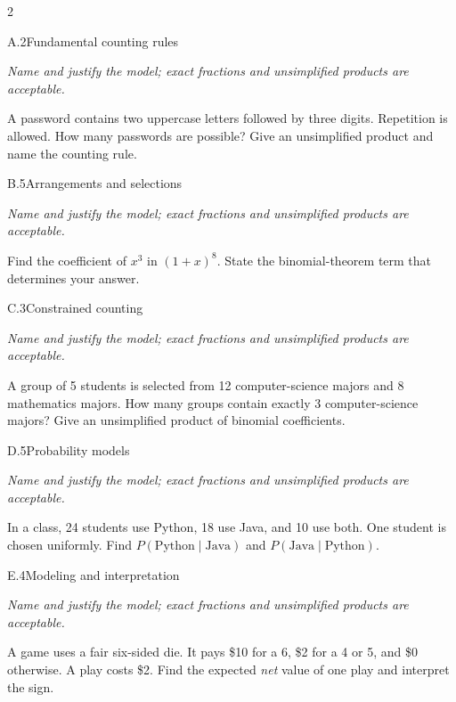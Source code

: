 \documentclass[9pt]{extarticle}
\begin{document}
\CoreWorkArea
\FormBreak
{}
\begin{multicols}{2}
\begin{CoreProblem}{A.2}{Fundamental counting rules}
{\scriptsize\textit{Name and justify the model; exact fractions and unsimplified products are acceptable.}\par}
A password contains two uppercase letters followed by three digits.
    Repetition is allowed. How many passwords are possible? Give an unsimplified
    product and name the counting rule.
\end{CoreProblem}
\begin{CoreProblem}{B.5}{Arrangements and selections}
{\scriptsize\textit{Name and justify the model; exact fractions and unsimplified products are acceptable.}\par}
Find the coefficient of $x^3$ in $(1+x)^8$. State the binomial-theorem
    term that determines your answer.
\end{CoreProblem}
\begin{CoreProblem}{C.3}{Constrained counting}
{\scriptsize\textit{Name and justify the model; exact fractions and unsimplified products are acceptable.}\par}
A group of 5 students is selected from 12 computer-science majors and
    8 mathematics majors. How many groups contain exactly 3 computer-science
    majors? Give an unsimplified product of binomial coefficients.
\end{CoreProblem}
\columnbreak
\begin{CoreProblem}{D.5}{Probability models}
{\scriptsize\textit{Name and justify the model; exact fractions and unsimplified products are acceptable.}\par}
In a class, 24 students use Python, 18 use Java, and 10 use both.
    One student is chosen uniformly. Find
    $P(\text{Python}\mid\text{Java})$ and
    $P(\text{Java}\mid\text{Python})$.
\end{CoreProblem}
\begin{CoreProblem}{E.4}{Modeling and interpretation}
{\scriptsize\textit{Name and justify the model; exact fractions and unsimplified products are acceptable.}\par}
A game uses a fair six-sided die. It pays \$10 for a 6, \$2 for a 4
    or 5, and \$0 otherwise. A play costs \$2. Find the expected \emph{net}
    value of one play and interpret the sign.
\end{CoreProblem}
\end{multicols}
\end{document}
